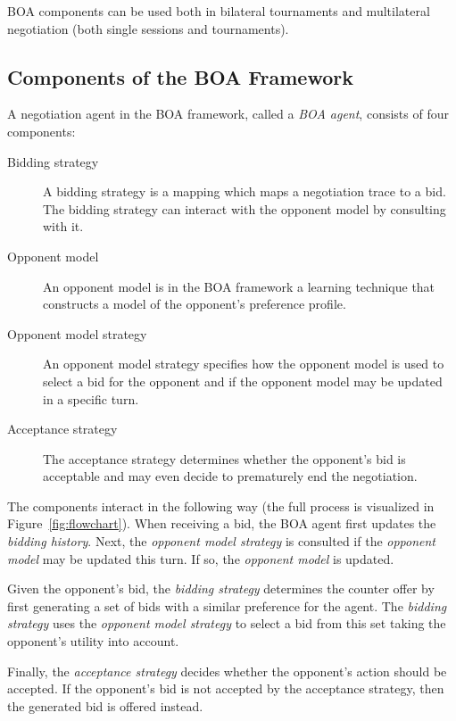 \documentclass[]{article}
\begin{document}
BOA components can be used both in bilateral tournaments and multilateral negotiation (both single sessions and tournaments). 



\subsection{Components of the BOA Framework}
A negotiation agent in the BOA framework, called a \textit{BOA agent}, consists of four components:
\begin{description}
  \item[Bidding strategy] A bidding strategy is a mapping which maps a negotiation trace to a bid. The bidding strategy can interact with the opponent model by consulting with it.%

  \item[Opponent model] An opponent model is in the BOA framework a learning technique that constructs a model of the opponent's preference profile.%
  \item[Opponent model strategy] An opponent model strategy specifies how the opponent model is used to select a bid for the opponent and if the opponent model may be updated in a specific turn.
  \item[Acceptance strategy] The acceptance strategy determines whether the opponent's bid is acceptable and may even decide to prematurely end the negotiation.
\end{description}
The components interact in the following way (the full process is visualized in Figure~\ref{fig:flowchart}). When receiving a bid, the BOA agent first  updates the \textit{bidding history}. Next, the \textit{opponent model strategy} is consulted if the \textit{opponent model} may be updated this turn. If so, the \textit{opponent model} is updated.

Given the opponent's bid, the \textit{bidding strategy} determines the counter offer by first generating a set of bids with a similar preference for the agent. The \textit{bidding strategy} uses the \textit{opponent model strategy} to select a bid from this set taking the opponent's utility into account.

Finally, the \textit{acceptance strategy} decides whether the opponent's action should be accepted. If the opponent's bid is not accepted by the acceptance strategy, then the generated bid is offered instead.
\end{document}
